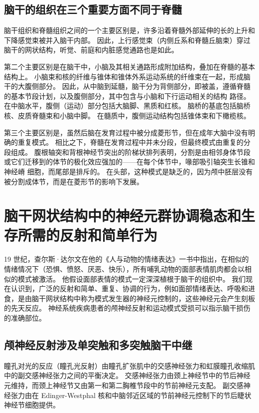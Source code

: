 \subsection{脑干的组织在三个重要方面不同于脊髓}

脑干组织和脊髓组织之间的一个主要区别是，许多沿着脊髓外部延伸的长的上升和下降感觉束被并入脑干内部。 因此，上行感觉束（内侧丘系和脊髓丘脑束）穿过脑干的网状结构，听觉、前庭和内脏感觉通路也是如此。

第二个主要区别是在脑干中，小脑及其相关通路形成附加结构，叠加在脊髓的基本结构上。 小脑束和核的纤维与锥体和锥体外系运动系统的纤维束在一起，形成脑干的大腹侧部分。 因此，从中脑到延髓，脑干分为背侧部分，即被盖，遵循脊髓的基本节段计划，以及腹侧部分，其中包含与小脑和下行运动相关的结构 路径。 在中脑水平，腹侧（运动）部分包括大脑脚、黑质和红核。 脑桥的基底包括脑桥核、皮质脊髓束和小脑中脚。 在髓质中，腹侧运动结构包括锥体束和下橄榄核。

第三个主要区别是，虽然后脑在发育过程中被分成菱形节，但在成年大脑中没有明确的重复模式。 相比之下，脊髓在发育过程中并未分段，但最终模式由重复的分段组成。 腹根轴突和背根神经节突出的阶梯状排列表明，分割是由相邻身体节段或它们迁移到的体节的极化效应强加的——在每个体节中，喙部吸引轴突生长锥和神经嵴 细胞，而尾部是排斥的。 在头部，这种模式是缺乏的，因为颅中胚层没有被分割成体节，而是在菱形节的影响下发展。


\section{脑干网状结构中的神经元群协调稳态和生存所需的反射和简单行为}
19 世纪，查尔斯·达尔文在他的《人与动物的情绪表达》一书中指出，在相似的情绪情况下（恐惧、愤怒、厌恶、快乐），所有哺乳动物的面部表情肌肉都会以相似的模式被激活。 他假设面部表情的模式一定深深植根于脑干的组织中。 我们现在认识到，广泛的反射和简单、重复、协调的行为，例如面部情绪表达、呼吸和进食，是由脑干网状结构中称为模式发生器的神经元控制的，这些神经元会产生刻板的先天反应。 神经系统疾病患者的颅神经反射和运动模式受损可以指示脑干损伤的准确部位。

\subsection{颅神经反射涉及单突触和多突触脑干中继}
瞳孔对光的反应（瞳孔光反射）由瞳孔扩张肌中的交感神经张力和虹膜瞳孔收缩肌中的副交感神经张力之间的平衡决定。 交感神经张力由颈上神经节中的节后神经元维持，而颈上神经节又由第一和第二胸椎节段中的节前神经元支配。 副交感神经张力由在 Edinger-Westphal 核和中脑邻近区域的节前神经元控制下的节后睫状神经节细胞提供。

